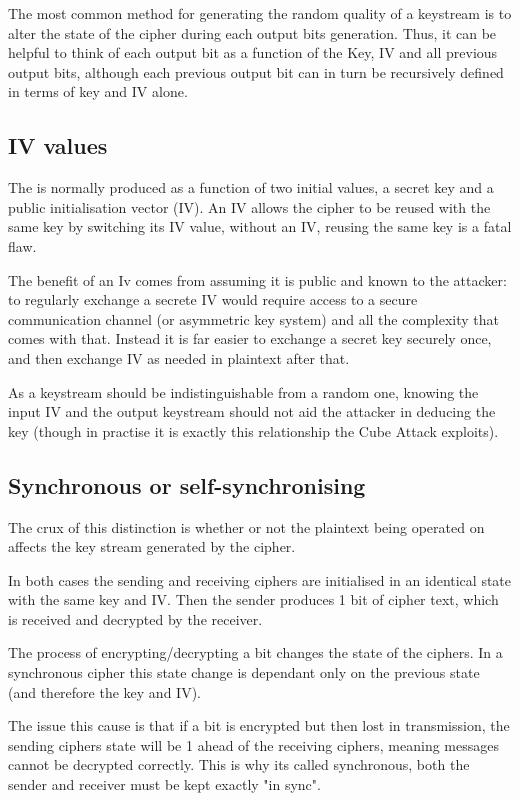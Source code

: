 \documentclass{report}
\let\Oldsubsection\subsection
\renewcommand{\subsection}{\FloatBarrier\Oldsubsection}
\begin{document}
The most common method %
for generating the random quality of a keystream is to alter the state of the cipher during each output bits generation. Thus, it can be helpful to think of each output bit as a function of the Key, IV and all previous output bits, although each previous output bit can in turn be recursively defined in terms of key and IV alone.

\subsection*{IV values}
The is normally produced as a function of two initial values, a secret key and a public initialisation vector (IV). An IV allows the cipher to be reused with the same key by switching its IV value, without an IV, reusing the same key is a fatal flaw.

The benefit of an Iv comes from assuming it is public and known to the attacker: to regularly exchange a secrete IV would require access to a secure communication channel (or asymmetric key system) and all the complexity that comes with that. Instead it is far easier to exchange a secret key securely once, and then exchange IV as needed in plaintext after that.

As a keystream should be indistinguishable from a random one, knowing the input IV and the output keystream should not aid the attacker in deducing the key (though in practise it is exactly this relationship the Cube Attack exploits).

\subsection{Synchronous or self-synchronising}
The crux of this distinction is whether or not the plaintext being operated on affects the key stream generated by the cipher.

In both cases the sending and receiving ciphers are initialised in an identical state with the same key and IV. Then the sender produces 1 bit of cipher text, which is received and decrypted by the receiver.

The process of encrypting/decrypting a bit changes the state of the ciphers. In a synchronous cipher this state change is dependant only on the previous state (and therefore the key and IV).

The issue this cause is that if a bit is encrypted but then lost in transmission, the sending ciphers state will be 1 ahead of the receiving ciphers, meaning messages cannot be decrypted correctly. This is why its called synchronous, both the sender and receiver must be kept exactly "in sync".
\end{document}

